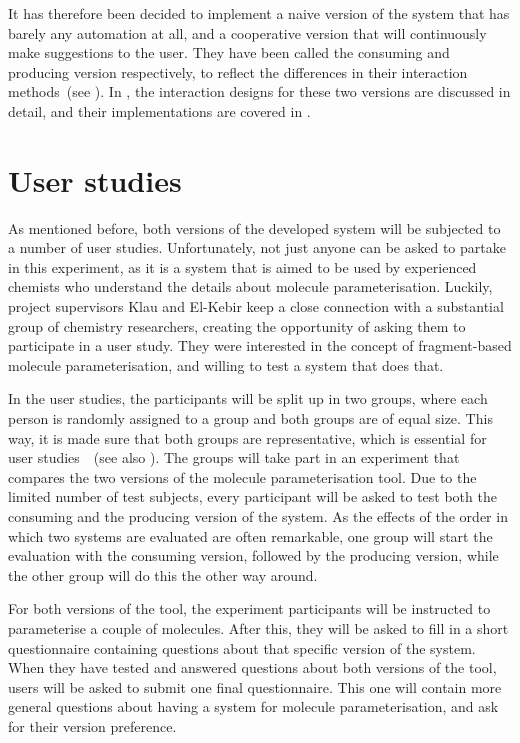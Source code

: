 It has therefore been decided to implement a naive version of the system that has barely any automation at all, and a cooperative version that will continuously make suggestions to the user. They have been called the consuming and producing version respectively, to reflect the differences in their interaction methods~(see ). In , the interaction designs for these two versions are discussed in detail, and their implementations are covered in .



\section{User studies}
As mentioned before, both versions of the developed system will be subjected to a number of user studies. Unfortunately, not just anyone can be asked to partake in this experiment, as it is a system that is aimed to be used by experienced chemists who understand the details about molecule parameterisation. Luckily, project supervisors Klau and El-Kebir keep a close connection with a substantial group of chemistry researchers, creating the opportunity of asking them to participate in a user study. They were interested in the concept of fragment-based molecule parameterisation, and willing to test a system that does that.

In the user studies, the participants will be split up in two groups, where each person is randomly assigned to a group and both groups are of equal size. This way, it is made sure that both groups are representative, which is essential for user studies~\cite{wohlin2003empirical}~(see also ). The groups will take part in an experiment that compares the two versions of the molecule parameterisation tool. Due to the limited number of test subjects, every participant will be asked to test both the consuming and the producing version of the system. As the effects of the order in which two systems are evaluated are often remarkable, one group will start the evaluation with the consuming version, followed by the producing version, while the other group will do this the other way around.

For both versions of the tool, the experiment participants will be instructed to parameterise a couple of molecules. After this, they will be asked to fill in a short questionnaire containing questions about that specific version of the system. When they have tested and answered questions about both versions of the tool, users will be asked to submit one final questionnaire. This one will contain more general questions about having a system for molecule parameterisation, and ask for their version preference.


